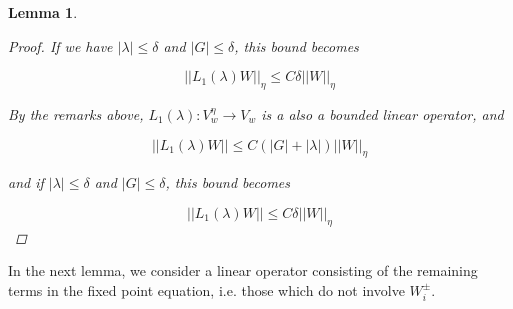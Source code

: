 \documentclass[12pt]{article}
\newtheorem{lemma}{Lemma}
\begin{document}
\begin{lemma}
\begin{proof}
If we have $|\lambda| \leq \delta$ and $|G| \leq \delta$, this bound becomes

\begin{equation}
||L_1(\lambda)W||_\eta \leq C \delta ||W||_\eta
\end{equation}

By the remarks above, $L_1(\lambda): V_w^\eta \rightarrow V_w$ is a also a bounded linear operator, and

\begin{equation}
||L_1(\lambda)W|| \leq C\left(|G| +|\lambda|\right)||W||_\eta
\end{equation}

and if $|\lambda| \leq \delta$ and $|G| \leq \delta$, this bound becomes

\begin{equation}
||L_1(\lambda)W|| \leq C \delta ||W||_\eta
\end{equation}

\end{proof}
\end{lemma}

In the next lemma, we consider a linear operator consisting of the remaining terms in the fixed point equation, i.e. those which do not involve $W_i^\pm$.
\end{document}
